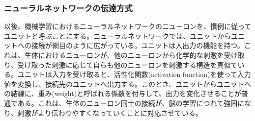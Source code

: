 \subsubsection{ニューラルネットワークの伝達方式}
以後、機械学習におけるニューラルネットワークのニューロンを、慣例に従ってユニットと呼ぶことにする。ニューラルネットワークでは、ユニットからユニットへの接続が網目のように広がっている。ユニットは入出力の機能を持つ。これは、生体におけるニューロンが、他のニューロンから化学的な刺激を受け取り、受け取った刺激に応じて自らも他のニューロンを刺激する構造を真似ている。ユニットは入力を受け取ると、活性化関数(activation function)を使って入力値を変換し、接続先のユニットへ出力する。このとき、ユニットからユニットへの結線に、重み(weight)と呼ばれる係数を付与して、出力を変化させることが普通である。これは、生体のニューロン同士の接続が、脳の学習につれて強固になり、刺激がより伝わりやすくなっていくことに対応させている。
